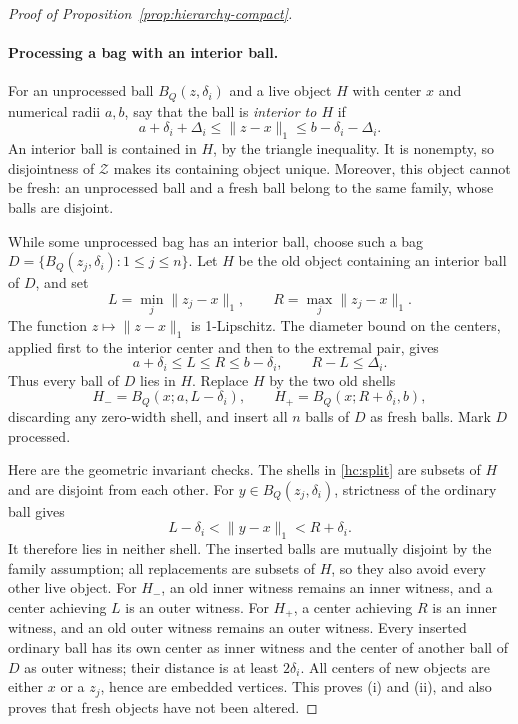 \begin{proof}[Proof of Proposition~\ref{prop:hierarchy-compact}]
\paragraph{Processing a bag with an interior ball.}
For an unprocessed ball \(B_Q(z,\delta_i)\) and a live object \(H\)
with center \(x\) and numerical radii \(a,b\), say that the ball is
\emph{interior to \(H\)} if
\begin{equation}
\label{hc:interior}
 a+\delta_i+\Delta_i\le\|z-x\|_1
 \le b-\delta_i-\Delta_i.
\end{equation}
An interior ball is contained in \(H\), by the triangle inequality.
It is nonempty, so disjointness of \(\mathcal Z\) makes its containing
object unique.  Moreover, this object cannot be fresh: an unprocessed
ball and a fresh ball belong to the same family, whose balls are
disjoint.

While some unprocessed bag has an interior ball, choose such a bag
\(D=\{B_Q(z_j,\delta_i):1\le j\le n\}\).  Let \(H\) be the old
object containing an interior ball of \(D\), and set
\[
 L=\min_j\|z_j-x\|_1,
 \qquad R=\max_j\|z_j-x\|_1.
\]
The function \(z\mapsto\|z-x\|_1\) is 1-Lipschitz.  The diameter
bound on the centers, applied first to the interior center and then
to the extremal pair, gives
\begin{equation}
\label{hc:radial-span}
 a+\delta_i\le L\le R\le b-\delta_i,
 \qquad R-L\le\Delta_i.
\end{equation}
Thus every ball of \(D\) lies in \(H\).
Replace \(H\) by the two old shells
\begin{equation}
\label{hc:split}
 H_-=B_Q(x;a,L-\delta_i),
 \qquad H_+=B_Q(x;R+\delta_i,b),
\end{equation}
discarding any zero-width shell, and insert all \(n\) balls of \(D\)
as fresh balls.  Mark \(D\) processed.

Here are the geometric invariant checks.  The shells in
\eqref{hc:split} are subsets of \(H\) and are disjoint from each other.
For \(y\in B_Q(z_j,\delta_i)\), strictness of the ordinary ball gives
\[
 L-\delta_i<\|y-x\|_1<R+\delta_i.
\]
It therefore lies in neither shell.  The inserted balls are mutually
disjoint by the family assumption; all replacements are subsets of
\(H\), so they also avoid every other live object.
For \(H_-\), an old inner witness remains an inner witness, and a
center achieving \(L\) is an outer witness.  For \(H_+\), a center
achieving \(R\) is an inner witness, and an old outer witness remains
an outer witness.  Every inserted ordinary ball has its own center
as inner witness and the center of another ball of \(D\) as outer
witness; their distance is at least \(2\delta_i\).
All centers of new objects are either \(x\) or a \(z_j\), hence are
embedded vertices.  This proves (i) and (ii), and also proves that
fresh objects have not been altered.


\end{proof}
